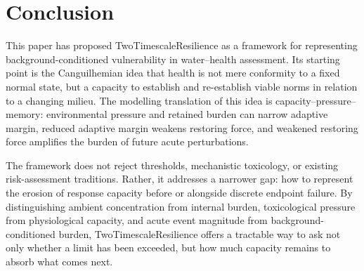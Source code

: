 \section{Conclusion}
\label{sec:conclusion}

This paper has proposed TwoTimescaleResilience as a framework for representing background-conditioned vulnerability in water--health assessment. Its starting point is the Canguilhemian idea that health is not mere conformity to a fixed normal state, but a capacity to establish and re-establish viable norms in relation to a changing milieu. The modelling translation of this idea is capacity--pressure--memory: environmental pressure and retained burden can narrow adaptive margin, reduced adaptive margin weakens restoring force, and weakened restoring force amplifies the burden of future acute perturbations.

The framework does not reject thresholds, mechanistic toxicology, or existing risk-assessment traditions. Rather, it addresses a narrower gap: how to represent the erosion of response capacity before or alongside discrete endpoint failure. By distinguishing ambient concentration from internal burden, toxicological pressure from physiological capacity, and acute event magnitude from background-conditioned burden, TwoTimescaleResilience offers a tractable way to ask not only whether a limit has been exceeded, but how much capacity remains to absorb what comes next.





